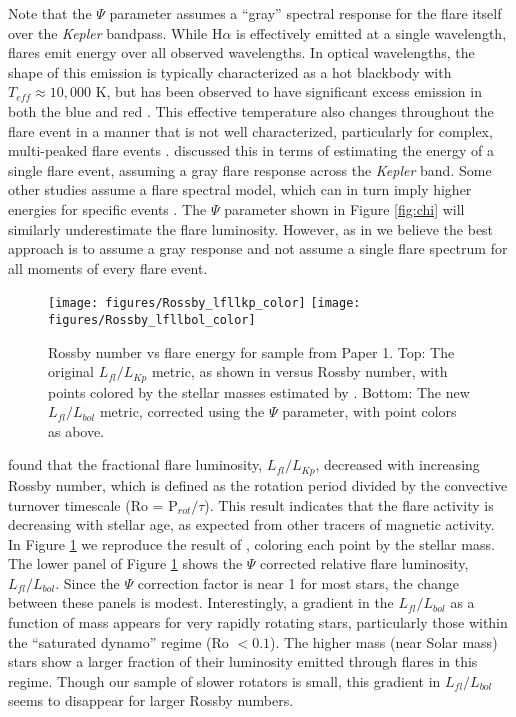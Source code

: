\documentclass[preprint2]{aastex62}
\newcommand{\Kepler}{\textsl{Kepler}\xspace}
\begin{document}
Note that the $\Psi$ parameter assumes a ``gray'' spectral response for the flare itself over the \Kepler bandpass. While H$\alpha$ is effectively emitted at a single wavelength, flares emit energy over all observed wavelengths. In optical wavelengths, the shape of this emission is typically characterized as a hot blackbody with $T_{eff}\approx10,000$ K, but has been observed to have significant excess emission in both the blue and red \citep[e.g. see][]{kowalski2013}. This effective temperature also changes throughout the flare event in a manner that is not well characterized, particularly for complex, multi-peaked flare events \citep[e.g.][]{slhadleo,kowalski2012}. \citet{davenport2016} discussed this in terms of estimating the energy of a single flare event, assuming a gray flare response across the \Kepler band. Some other studies assume a flare spectral model, which can in turn imply higher energies for specific events \citep[e.g.][]{gizis2013,maehara2015}. The $\Psi$ parameter shown in Figure \ref{fig:chi} will similarly underestimate the flare luminosity. However, as in \citet{davenport2016} we believe the best approach is to assume a gray response and not assume a single flare spectrum for all moments of every flare event.


\begin{figure}[!t]
\centering
\texttt{[image: figures/Rossby\_lfllkp\_color]}
\texttt{[image: figures/Rossby\_lfllbol\_color]}
\caption{
Rossby number vs flare energy for sample from Paper 1.
Top: The original $L_{fl}/L_{Kp}$ metric, as shown in \citet{davenport2016} versus Rossby number, with points colored by the stellar masses estimated by \citet{davenport2016} .
Bottom: The new $L_{fl}/L_{bol}$ metric, corrected using the $\Psi$ parameter, with point colors as above.
}
\label{fig:rossby1}
\end{figure}
  

\citet{davenport2016} found that the fractional flare luminosity, $L_{fl}/L_{Kp}$, decreased with increasing Rossby number, which is defined as the rotation period divided by the convective turnover timescale (Ro = P$_{rot} / \tau$). This result indicates that the flare activity is decreasing with stellar age, as expected from other tracers of magnetic activity. In Figure \ref{fig:rossby1} we reproduce the result of \citet{davenport2016}, coloring each point by the stellar mass. The lower panel of Figure \ref{fig:rossby1} shows the $\Psi$ corrected relative flare luminosity, $L_{fl}/L_{bol}$. Since the $\Psi$ correction factor is near 1 for most stars, the change between these panels is modest. Interestingly, a gradient in the $L_{fl}/L_{bol}$ as a function of mass appears for very rapidly rotating stars, particularly those within the ``saturated dynamo'' regime (Ro $< 0.1$). The higher mass (near Solar mass) stars show a larger fraction of their luminosity emitted through flares in this regime. Though our sample of slower rotators is small, this gradient in $L_{fl}/L_{bol}$ seems to disappear for larger Rossby numbers. 
\end{document}
